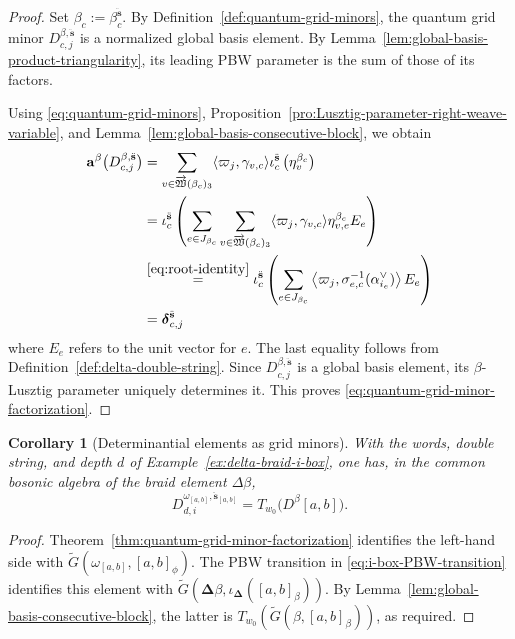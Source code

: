\documentclass[12pt, reqno]{amsart}
\theoremstyle{plain}
\newtheorem{corollary}[theorem]{Corollary}
\theoremstyle{definition}
\numberwithin{equation}{section}
\newcommand{\bfa}{\mathbf{a}}
\begin{document}
\begin{proof}
Set \(\beta_c:=\beta_c^{\ddot{\mathbf s}}\). By
Definition~\ref{def:quantum-grid-minors}, the quantum grid minor
\(D_{c,j}^{\beta,\ddot{\mathbf s}}\) is a normalized global basis element. By
Lemma~\ref{lem:global-basis-product-triangularity}, its leading PBW
parameter is the sum of those of its factors.

Using \eqref{eq:quantum-grid-minors},
Proposition~\ref{pro:Lusztig-parameter-right-weave-variable}, and
Lemma~\ref{lem:global-basis-consecutive-block}, we obtain
\[
\begin{aligned}
    \bfa^\beta\bigl(D_{c,j}^{\beta,\ddot{\mathbf s}}\bigr)
    &=
    \sum_{
        v\in\overrightarrow{\mathfrak W}(\beta_c)_3
    }
    \langle\varpi_j,\gamma_{v,c}\rangle
    \iota_c^{\ddot{\mathbf s}}
    \left(\eta_v^{\beta_c}\right)                                      \\
    &=
    \iota_c^{\ddot{\mathbf s}}\left(
        \sum_{e\in J_{\beta_c}}
        \sum_{
            v\in\overrightarrow{\mathfrak W}(\beta_c)_3
        }
        \langle\varpi_j,\gamma_{v,c}\rangle
        \eta_{v,e}^{\beta_c}E_e
    \right)                                                            \\
    &\stackrel{\eqref{eq:root-identity}}{=}
    \iota_c^{\ddot{\mathbf s}}\left(
        \sum_{e\in J_{\beta_c}}
        \left\langle
            \varpi_j,
            \sigma_{e,c}^{-1}(\alpha^\vee_{i_e})
        \right\rangle E_e
    \right)                                                            \\
    &=
    \boldsymbol\delta_{c,j}^{\ddot{\mathbf s}}
\end{aligned}
\]
where $E_e$ refers to the unit vector for $e$. The last equality follows from
Definition~\ref{def:delta-double-string}. Since
\(D_{c,j}^{\beta,\ddot{\mathbf s}}\) is a global basis element, its
\(\beta\)-Lusztig parameter uniquely determines it. This proves
\eqref{eq:quantum-grid-minor-factorization}.
\end{proof}

\begin{corollary}[Determinantial elements as grid minors]
\label{cor:determinantial-grid-identification}
With the words, double string, and depth \(d\) of
Example~\ref{ex:delta-braid-i-box}, one has, in the common bosonic
algebra of the braid element \(\Delta\beta\),
\begin{equation}\label{eq:determinantial-grid-identification}
    D_{d,i}^{\omega_{[a,b]},\ddot{\mathbf s}_{[a,b]}}
    =T_{w_0}\bigl(D^\beta[a,b]\bigr).
\end{equation}
\end{corollary}
\begin{proof}
Theorem~\ref{thm:quantum-grid-minor-factorization} identifies the
left-hand side with
\(\widetilde G(\omega_{[a,b]},[a,b]_\phi)\).
The PBW transition in \eqref{eq:i-box-PBW-transition} identifies
this element with
\(\widetilde G(\boldsymbol\Delta\beta,
\iota_{\boldsymbol\Delta}([a,b]_\beta))\).
By Lemma~\ref{lem:global-basis-consecutive-block}, the latter is
\(T_{w_0}(\widetilde G(\beta,[a,b]_\beta))\), as required.
\end{proof}
\end{document}
